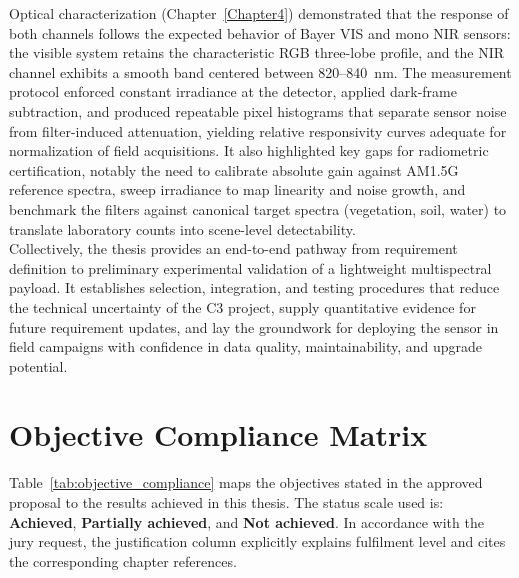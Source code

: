 \noindent Optical characterization (Chapter~\ref{Chapter4}) demonstrated that the response of both channels follows the expected behavior of Bayer VIS and mono NIR sensors: the visible system retains the characteristic RGB three-lobe profile, and the NIR channel exhibits a smooth band centered between 820--840~nm. The measurement protocol enforced constant irradiance at the detector, applied dark-frame subtraction, and produced repeatable pixel histograms that separate sensor noise from filter-induced attenuation, yielding relative responsivity curves adequate for normalization of field acquisitions. It also highlighted key gaps for radiometric certification, notably the need to calibrate absolute gain against AM1.5G reference spectra, sweep irradiance to map linearity and noise growth, and benchmark the filters against canonical target spectra (vegetation, soil, water) to translate laboratory counts into scene-level detectability.\\

\noindent Collectively, the thesis provides an end-to-end pathway from requirement definition to preliminary experimental validation of a lightweight multispectral payload. It establishes selection, integration, and testing procedures that reduce the technical uncertainty of the C3 project, supply quantitative evidence for future requirement updates, and lay the groundwork for deploying the sensor in field campaigns with confidence in data quality, maintainability, and upgrade potential.\\

\section{Objective Compliance Matrix}

\noindent Table~\ref{tab:objective_compliance} maps the objectives stated in the approved proposal to the results achieved in this thesis. The status scale used is: \textbf{Achieved}, \textbf{Partially achieved}, and \textbf{Not achieved}. In accordance with the jury request, the justification column explicitly explains fulfilment level and cites the corresponding chapter references.\\

